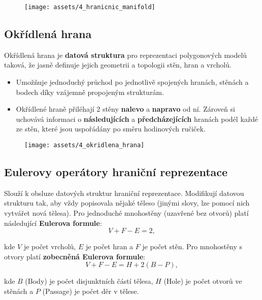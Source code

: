 \begin{figure}[H]
    \centering
    \texttt{[image: assets/4\_hranicnic\_manifold]}
\end{figure}

\subsection{Okřídlená hrana}
Okřídlená hrana je \textbf{datová struktura} pro reprezentaci polygonových modelů taková, že jasně definuje jejich geometrii a topologii stěn, hran a vrcholů.

\begin{itemize}
    \item Umožňuje jednoduchý průchod po jednotlivě spojených hranách, stěnách a bodech díky vzájemně propojeným strukturám.
    \item Okřídlené hraně přiléhají 2 stěny \textbf{nalevo} a \textbf{napravo} od ní. Zároveň si uchovává informaci o \textbf{následujících} a \textbf{předcházejících} hranách podél každé ze stěn, které jsou uspořádány po směru hodinových ručiček.
\end{itemize}

\begin{figure}[H]
    \centering
    \texttt{[image: assets/4\_okridlena\_hrana]}
\end{figure}

\subsection{Eulerovy operátory hraniční reprezentace}
Slouží k obsluze datových struktur hraniční reprezentace. Modifikují datovou strukturu tak, aby vždy popisovala nějaké těleso (jinými slovy, lze pomocí nich vytvářet nová tělesa). Pro jednoduché mnohostěny (uzavřené bez otvorů) platí následující \textbf{Eulerova formule}:
\begin{equation*}
    V + F - E = 2,
\end{equation*}

kde $ V $ je počet vrcholů, $ E $ je počet hran a $ F $ je počet stěn. Pro mnohostěny s otvory platí \textbf{zobecněná Eulerova formule}:
\begin{equation*}
    V + F - E = H + 2(B - P),
\end{equation*}

kde $ B $ (Body) je počet disjunktních částí tělesa, $ H $ (Hole) je počet otvorů ve stěnách a $ P $ (Passage) je počet děr v tělese.

